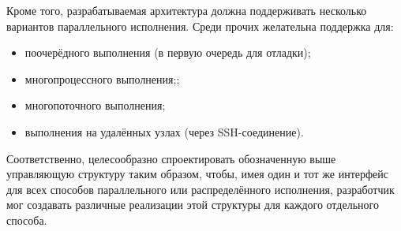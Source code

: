 Кроме того, разрабатываемая архитектура должна поддерживать несколько вариантов параллельного исполнения. Среди прочих желательна поддержка для:
\begin{itemize}
    \item поочерёдного выполнения (в первую очередь для отладки);
    \item многопроцессного выполнения;;
    \item многопоточного выполнения;
    \item выполнения на удалённых узлах (через SSH-соединение).
\end{itemize}

Соответственно, целесообразно спроектировать обозначенную выше управляющую структуру таким образом, чтобы, имея один и тот же интерфейс для всех способов параллельного или распределённого исполнения, разработчик мог создавать различные реализации этой структуры для каждого отдельного способа. 

\noteattributes{}

